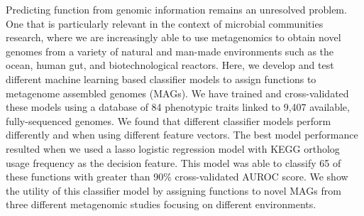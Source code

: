 \documentclass[10pt,letterpaper]{article}
\begin{document}
Predicting function from genomic information remains an unresolved problem. One that is particularly relevant in the context of microbial communities research, where we are increasingly able to use metagenomics to obtain novel genomes from a variety of natural and man-made environments such as the ocean, human gut, and biotechnological reactors. Here, we develop and test different machine learning based classifier models to assign functions to metagenome assembled genomes (MAGs). We have trained and cross-validated these models using a database of 84 phenotypic traits linked to 9,407 available, fully-sequenced genomes. We found that different classifier models perform differently and when using different feature vectors. The best model performance resulted when we used a lasso logistic regression model with KEGG ortholog usage frequency as the decision feature. This model was able to classify 65 of these functions with greater than 90\% cross-validated AUROC score. We show the utility of this classifier model by assigning functions to novel MAGs from three different metagenomic studies focusing on different environments.


\linenumbers

\end{document}
